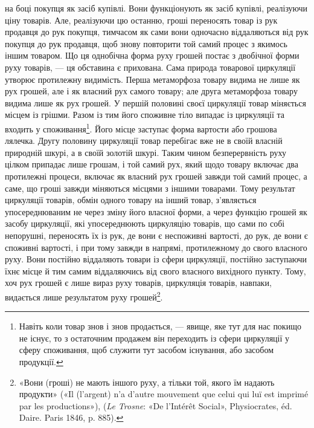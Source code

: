 \parcont{}  %
на боці покупця як засіб купівлі. Вони функціонують як засіб
купівлі, реалізуючи ціну товарів. Але, реалізуючи цю останню,
гроші переносять товар із рук продавця до рук покупця, тимчасом
як сами вони одночасно віддаляються від рук покупця до
рук продавця, щоб знову повторити той самий процес з якимось
іншим товаром. Що ця однобічна форма руху грошей постає з
двобічної форми руху товарів, — ця обставина є прихована. Сама
природа товарової циркуляції утворює протилежну видимість.
Перша метаморфоза товару видима не лише як рух грошей, але
і як власний рух самого товару; але друга метаморфоза товару
видима лише як рух грошей. У першій половині своєї циркуляції
товар міняється місцем із грішми. Разом із тим його споживне
тіло випадає із циркуляції та входить у споживання\footnote{
Навіть коли товар знов і знов продається, — явище, яке тут для нас
покищо не існує, то з остаточним продажем він переходить із сфери циркуляції
у сферу споживання, щоб служити тут засобом існування, або
засобом продукції.
}. Його
місце заступає форма вартости або грошова лялечка. Другу
половину циркуляції товар перебігає вже не в своїй власній
природній шкурі, а в своїй золотій шкурі. Таким чином безперервність
руху цілком припадає лише грошам, і той самий рух,
який щодо товару включає два протилежні процеси, включає як
власний рух грошей завжди той самий процес, а саме, що гроші
завжди міняються місцями з іншими товарами. Тому результат
циркуляції товарів, обмін одного товару на інший товар, з’являється
упосереднюваним не через зміну його власної форми, а
через функцію грошей як засобу циркуляції, які упосереднюють
циркуляцію товарів, що сами по собі непорушні, переносять їх
із рук, де вони є неспоживні вартості, до рук, де вони є споживні
вартості, і при тому завжди в напрямі, протилежному до свого
власного руху. Вони постійно віддаляють товари із сфери циркуляції,
постійно заступаючи їхнє місце й тим самим віддаляючись
від свого власного вихідного пункту. Тому, хоч рух грошей є
лише вираз руху товарів, циркуляція товарів, навпаки, видається
лише результатом руху грошей\footnote{
«Вони (гроші) не мають іншого руху, а тільки той, якого їм надають
продукти» («Il (l’argent) n’a d’autre mouvement que celui qui luï
est imprimé par les productions»), (\emph{Le Trosne}: «De l’Intérêt Social»,
Physiocrates, éd. Daire. Paris 1846, p. 885).
}.

